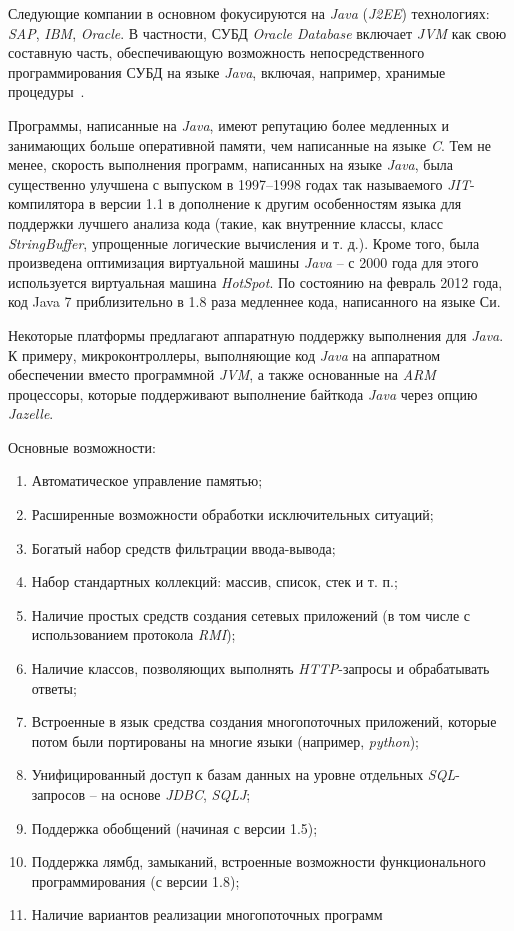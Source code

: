 Следующие компании в основном фокусируются на \textit{Java} (\textit{J2EE}) технологиях: \textit{SAP}, \textit{IBM}, \textit{Oracle}. В частности, СУБД \textit{Oracle Database} включает \textit{JVM} как свою составную часть, обеспечивающую возможность непосредственного программирования СУБД на языке \textit{Java}, включая, например, хранимые процедуры~\cite{java}.

Программы, написанные на \textit{Java}, имеют репутацию более медленных и занимающих больше оперативной памяти, чем написанные на языке \textit{C}. Тем не менее, скорость выполнения программ, написанных на языке \textit{Java}, была существенно улучшена с выпуском в 1997–1998 годах так называемого \textit{JIT}-компилятора в версии 1.1 в дополнение к другим особенностям языка для поддержки лучшего анализа кода (такие, как внутренние классы, класс \textit{StringBuffer}, упрощенные логические вычисления и т. д.). Кроме того, была произведена оптимизация виртуальной машины \textit{Java} – с 2000 года для этого используется виртуальная машина \textit{HotSpot}. По состоянию на февраль 2012 года, код Java 7 приблизительно в 1.8 раза медленнее кода, написанного на языке Си.

Некоторые платформы предлагают аппаратную поддержку выполнения для \textit{Java}. К примеру, микроконтроллеры, выполняющие код \textit{Java} на аппаратном обеспечении вместо программной \textit{JVM}, а также основанные на \textit{ARM} процессоры, которые поддерживают выполнение байткода \textit{Java} через опцию \textit{Jazelle}.

Основные возможности:
\begin{enumerate}
	\item Автоматическое управление памятью;
	\item Расширенные возможности обработки исключительных ситуаций;
	\item Богатый набор средств фильтрации ввода-вывода;
	\item Набор стандартных коллекций: массив, список, стек и т. п.;
	\item Наличие простых средств создания сетевых приложений (в том числе с использованием протокола \textit{RMI});
	\item Наличие классов, позволяющих выполнять \textit{HTTP}-запросы и обрабатывать ответы;
	\item Встроенные в язык средства создания многопоточных приложений, которые потом были портированы на многие языки (например, \textit{python});
	\item Унифицированный доступ к базам данных на уровне отдельных \textit{SQL}-запросов – на основе \textit{JDBC}, \textit{SQLJ};
	\item Поддержка обобщений (начиная с версии 1.5);
	\item Поддержка лямбд, замыканий, встроенные возможности функционального программирования (с версии 1.8);
	\item Наличие вариантов реализации многопоточных программ
\end{enumerate}

